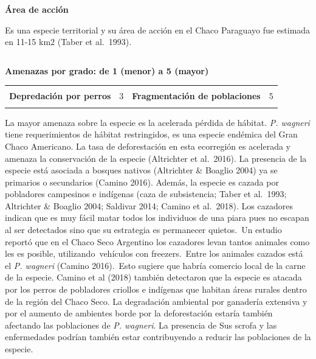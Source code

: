 \documentclass[
  x11names]{article}
\begin{document}
\textbf{Área de acción}

Es una especie territorial y su área de acción en el Chaco Paraguayo fue
estimada en 11-15 km2 (Taber et al.~1993).

%
\begin{table}[H]
\centering
\begin{tabular}[t]{>{\raggedright\arraybackslash}m{16cm}>{}m{16cm}}
\toprule
\cellcolor{ceil}{\textcolor{white}{\textbf{\rule{0pt}{14pt}CONSERVACIÓN E INVESTIGACIÓN}}}\\
\bottomrule
\end{tabular}
\end{table}

\vspace{-0.4cm}

\textbf{Amenazas por grado: de 1 (menor) a 5 (mayor)}

\begin{tabu} to 
\toprule
\textbf{} &  & \textbf{} & \\
\textbf{Depredación por perros} & 3 & \textbf{Fragmentación de poblaciones} & 5\\
\textbf{} &  & \textbf{} & \\
\bottomrule
\end{tabu}

La mayor amenaza sobre la especie es la acelerada pérdida de hábitat.
\textit{P. wagneri} tiene requerimientos de hábitat restringidos, es una
especie endémica del Gran Chaco Americano. La tasa de deforestación en
esta ecorregión es acelerada y amenaza la conservación de la especie
(Altrichter et al.~2016). La presencia de la especie está asociada a
bosques nativos (Altrichter \& Boaglio 2004) ya se primarios o
secundarios (Camino 2016). Además, la especie es cazada por pobladores
campesinos e indígenas (caza de subsistencia; Taber et al.~1993;
Altrichter \& Boaglio 2004; Saldivar 2014; Camino et al.~2018). Los
cazadores indican que es muy fácil matar todos los individuos de una
piara pues no escapan al ser detectados sino que su estrategia es
permanecer quietos.~Un estudio reportó que en el Chaco Seco Argentino
los cazadores levan tantos animales como les es posible,
utilizando~vehículos con freezers.~Entre los animales cazados está el
\textit{P. wagneri} (Camino 2016).~Esto sugiere que habría comercio
local de la carne de la especie. Camino et al (2018) también detectaron
que la especie es atacada por los perros de pobladores criollos e
indígenas que habitan áreas rurales dentro de la región del Chaco Seco.
La degradación ambiental por ganadería extensiva y por el aumento de
ambientes borde por la deforestación estaría también afectando las
poblaciones de \textit{P. wagneri}. La presencia de Sus scrofa y las
enfermedades podrían también estar contribuyendo a reducir las
poblaciones de la especie.
\end{document}
